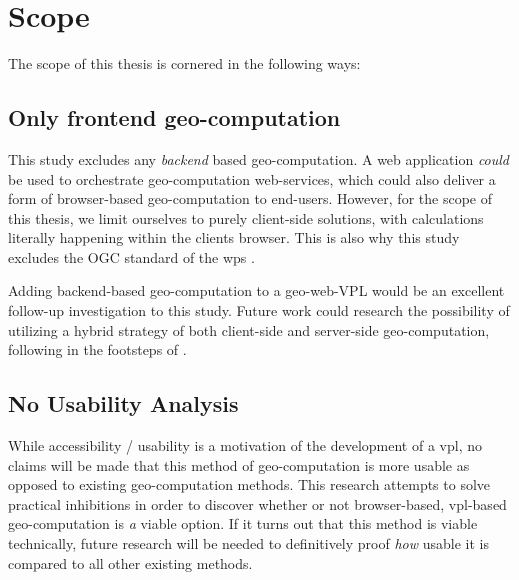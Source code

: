 
\newpage
\section{Scope}
The scope of this thesis is cornered in the following ways: 

\subsection*{Only frontend geo-computation}
This study excludes any \emph {backend} based geo-computation.
A web application \textit{could} be used to orchestrate geo-computation web-services, which could also deliver a form of browser-based geo-computation to end-users. 
However, for the scope of this thesis, we limit ourselves to purely client-side solutions, with calculations literally happening within the clients browser. 
This is also why this study excludes the OGC standard of the \ac{wps} \cite{ogc_web_2015}.

Adding backend-based geo-computation to a geo-web-VPL would be an excellent follow-up investigation to this study. 
Future work could research the possibility of utilizing a hybrid strategy of both client-side and server-side geo-computation, following in the footsteps of \cite{panidi_hybrid_2015}. 

\subsection*{No Usability Analysis} %
While accessibility / usability is a motivation of the development of a \ac{vpl}, no claims will be made that this method of geo-computation is more usable as opposed to existing geo-computation methods. This research attempts to solve practical inhibitions in order to discover whether or not browser-based, vpl-based geo-computation is \emph{a} viable option. If it turns out that this method is viable technically, future research will be needed to definitively proof \emph{how} usable it is compared to all other existing methods.  

